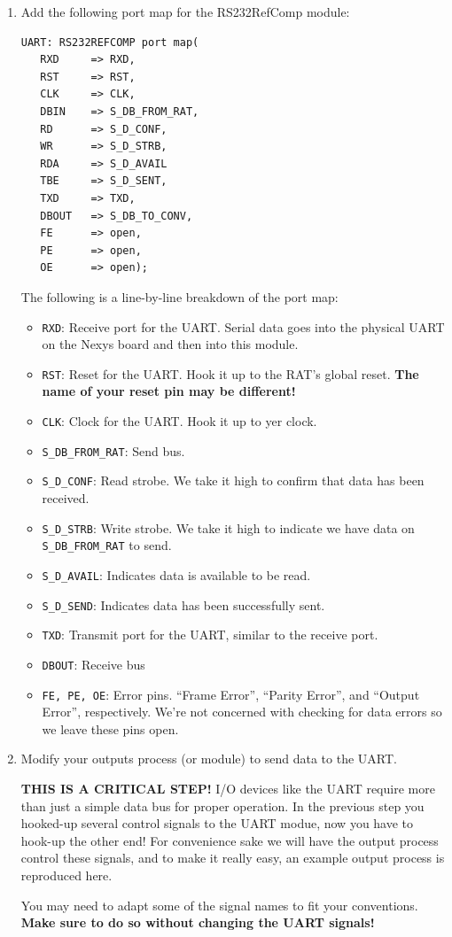 \documentclass[notitlepage]{article}
\newcommand{\warningsign}{\fontencoding{U}\fontfamily{futs}\Large\selectfont\char 66\relax}
\begin{document}
\begin {enumerate}
\item Add the following port map for the RS232RefComp module:
\begin{lstlisting}
UART: RS232REFCOMP port map(
   RXD     => RXD,
   RST     => RST,
   CLK     => CLK,
   DBIN    => S_DB_FROM_RAT,
   RD      => S_D_CONF,
   WR      => S_D_STRB,
   RDA     => S_D_AVAIL
   TBE     => S_D_SENT,
   TXD     => TXD,
   DBOUT   => S_DB_TO_CONV,
   FE      => open,
   PE      => open,
   OE      => open);
\end{lstlisting}
The following is a line-by-line breakdown of the port map:
\begin{itemize}
\item \texttt{RXD}: Receive port for the UART. Serial data goes into the physical UART on the Nexys board and then into this module.
\item \texttt{RST}: Reset for the UART. Hook it up to the RAT's global reset. \textbf{The name of your reset pin may be different!}
\item \texttt{CLK}: Clock for the UART. Hook it up to yer clock. 
\item \texttt{S\_DB\_FROM\_RAT}: Send bus.
\item \texttt{S\_D\_CONF}: Read strobe. We take it high to confirm that data has been received.
\item \texttt{S\_D\_STRB}: Write strobe. We take it high to indicate we have data on \texttt{S\_DB\_FROM\_RAT} to send.
\item \texttt{S\_D\_AVAIL}: Indicates data is available to be read.
\item \texttt{S\_D\_SEND}: Indicates data has been successfully sent.
\item \texttt{TXD}: Transmit port for the UART, similar to the receive port.
\item \texttt{DBOUT}: Receive bus
\item \texttt{FE, PE, OE}: Error pins. ``Frame Error'', ``Parity Error'', and ``Output Error'', respectively. We're not concerned with checking for data errors so we leave these pins open.
\end{itemize}

\item Modify your outputs process (or module) to send data to the UART.
\begin{infobox}
  {\warningsign} \textbf{THIS IS A CRITICAL STEP!} I/O devices like the UART require more than just a simple data bus for proper operation. In the previous step you hooked-up several control signals to the UART modue, now you have to hook-up the other end! For convenience sake we will have the output process control these signals, and to make it really easy, an example output process is reproduced here.
\end{infobox}
You may need to adapt some of the signal names to fit your conventions. \textbf{Make sure to do so without changing the UART signals!}


\end{enumerate}
\end{document}
